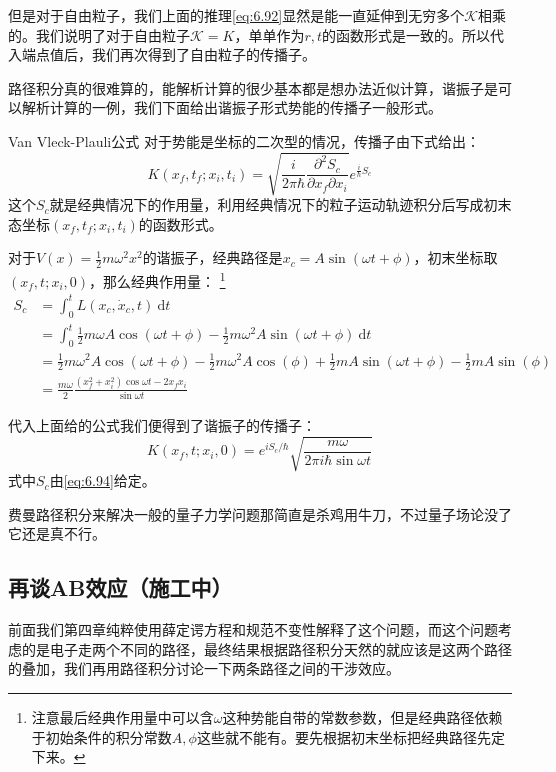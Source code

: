 \documentclass[a4paper,zihao=-4,linespread=1]{ctexrep}
\begin{document}
	但是对于自由粒子，我们上面的推理\ref{eq:6.92}显然是能一直延伸到无穷多个$\mathcal{K}$相乘的。我们说明了对于自由粒子$\mathcal{K}=K$，单单作为$r,t$的函数形式是一致的。所以代入端点值后，我们再次得到了自由粒子的传播子。
	
	路径积分真的很难算的，能解析计算的很少基本都是想办法近似计算，谐振子是可以解析计算的一例，我们下面给出谐振子形式势能的传播子一般形式。
	\begin{theorem}{Van Vleck-Plauli公式}
		对于势能是坐标的二次型的情况，传播子由下式给出：
		\begin{equation}
			K(x_f,t_f;x_i,t_i)=\sqrt{\frac{i}{2\pi\hbar}\frac{\partial^2S_c}{\partial x_f\partial x_i}}e^{\frac{i}{\hbar}S_c}
		\end{equation}
		这个$S_c$就是经典情况下的作用量，利用经典情况下的粒子运动轨迹积分后写成初末态坐标$(x_f,t_f;x_i,t_i)$的函数形式。
	\end{theorem}
	
	对于$V(x)=\frac{1}{2}m\omega^2x^2$的谐振子，经典路径是$x_c=A\sin(\omega t+\phi)$，初末坐标取$(x_f,t;x_i,0)$，那么经典作用量：	\footnote{注意最后经典作用量中可以含$\omega$这种势能自带的常数参数，但是经典路径依赖于初始条件的积分常数$A,\phi$这些就不能有。要先根据初末坐标把经典路径先定下来。}
	\begin{equation}
		\label{eq:6.94}
		\begin{aligned}
			S_c&=\int_{0}^t L(x_c,\dot{x}_c,t) \mathrm{~d}t\\
			&=\int_{0}^t \frac{1}{2}m\omega A\cos(\omega t+\phi)-\frac{1}{2}m\omega^2 A\sin(\omega t+\phi)\mathrm{~d}t\\
			&=\frac{1}{2}m\omega^2 A\cos(\omega t+\phi)-\frac{1}{2}m\omega^2 A\cos(\phi)+\frac{1}{2}m A\sin(\omega t+\phi)-\frac{1}{2}mA\sin(\phi)\\
			&=\frac{m\omega}{2} \frac{(x_f^2+x_i^2)\cos\omega t-2x_fx_i}{\sin\omega t}
		\end{aligned}
	\end{equation}
	
	代入上面给的公式我们便得到了谐振子的传播子：
	\begin{equation}
		K(x_f,t;x_i,0)=e^{iS_c/\hbar}\sqrt{\frac{m\omega}{2\pi i\hbar\sin\omega t}}
	\end{equation}
	式中$S_c$由\ref{eq:6.94}给定。
	
	费曼路径积分来解决一般的量子力学问题那简直是杀鸡用牛刀，不过量子场论没了它还是真不行。
	
	\subsection{再谈AB效应（施工中）}
	前面我们第四章纯粹使用薛定谔方程和规范不变性解释了这个问题，而这个问题考虑的是电子走两个不同的路径，最终结果根据路径积分天然的就应该是这两个路径的叠加，我们再用路径积分讨论一下两条路径之间的干涉效应。
	
\end{document}
